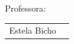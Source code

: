 \begin{titlepage}

Professora:\\
\vspace{0.20cm} %
\begin{tabular}{ll}
    Estela Bicho\\

  \end{tabular}%
  \\[0.3cm] %
\end{titlepage}
\newpage